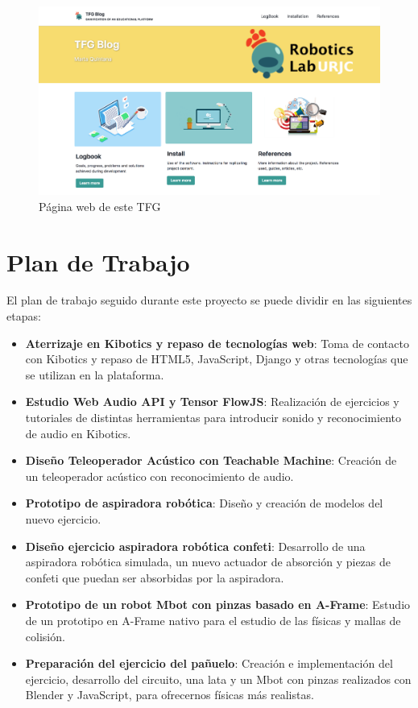 \begin{figure}[H]
    \centering
    \includegraphics[width=0.9\linewidth]{chapters/images/webtfg.png}
    \caption{Página web de este TFG}
    \label{fig:my_label}
\end{figure}

\newpage
\section{Plan de Trabajo}
El plan de trabajo seguido durante este proyecto se puede dividir en las siguientes etapas:

\begin{itemize}
    \item \textbf{Aterrizaje en Kibotics y repaso de tecnologías web}: Toma de contacto con Kibotics y repaso de HTML5, JavaScript, Django y otras tecnologías que se utilizan en la plataforma.
    
    \item \textbf{Estudio Web Audio API y Tensor FlowJS}: Realización de ejercicios y tutoriales de distintas herramientas para introducir sonido y reconocimiento de audio en Kibotics.
   
    \item \textbf{Diseño Teleoperador Acústico con Teachable Machine}: Creación de un teleoperador acústico con reconocimiento de audio. 

    \item \textbf{Prototipo de aspiradora robótica}: Diseño y creación de modelos del nuevo ejercicio.
    \item \textbf{Diseño ejercicio aspiradora robótica confeti}: Desarrollo de una aspiradora robótica simulada, un nuevo actuador de absorción y piezas de confeti que puedan ser absorbidas por la aspiradora.
    
    \item \textbf{Prototipo de un robot Mbot con pinzas basado en A-Frame}: Estudio de un prototipo en A-Frame nativo para el estudio de las físicas y mallas de colisión. 
    
    \item \textbf{Preparación del ejercicio del pañuelo}: Creación e implementación del ejercicio, desarrollo del circuito, una lata y un Mbot con pinzas realizados con Blender y JavaScript, para ofrecernos físicas más realistas.

\end{itemize}


